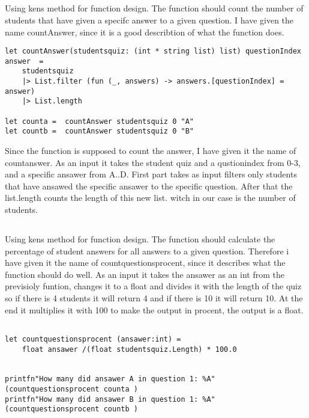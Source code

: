 \documentclass{article}
\begin{document}
\subsection{}

Using kens method for function design. The function should count the number of students that have given a specifc answer to a given question. I have given the name countAnswer, since it is a good describtion of what the function does.


 \begin{lstlisting}
let countAnswer(studentsquiz: (int * string list) list) questionIndex answer  = 
    studentsquiz
    |> List.filter (fun (_, answers) -> answers.[questionIndex] = answer)
    |> List.length 

let counta =  countAnswer studentsquiz 0 "A"
let countb =  countAnswer studentsquiz 0 "B"

    \end{lstlisting}

Since the function is supposed to count the answer, I have given it the name of countanswer. As an input it takes the student quiz and a qustionindex from 0-3, and a specific ansawer from A..D. First part takes as input  filters only students that have ansawed the specific ansawer to the specific question. After that the list.length counts the length of this new list. witch in our case is the number of students.

\subsection{}

Using kens method for function design. The function should calculate the percentage of student answers for all answers to a given question. Therefore i have given it the name of countquestionsprocent, since it describes what the function should do well. As an input it takes the ansawer as an int from the previsioly funtion, changes it to a float and divides it with the length of the quiz so if there is 4 students it will return 4 and if there is 10 it will return 10. At the end it multiplies it with 100 to make the output in procent, the output is a float.


 \begin{lstlisting}

let countquestionsprocent (ansawer:int) = 
    float ansawer /(float studentsquiz.Length) * 100.0 


printfn"How many did ansawer A in question 1: %A" (countquestionsprocent counta )
printfn"How many did ansawer B in question 1: %A" (countquestionsprocent countb )

    \end{lstlisting}
\end{document}

